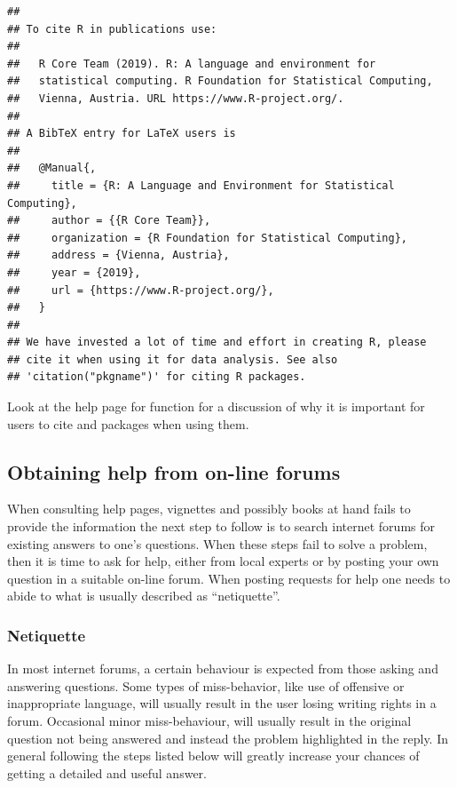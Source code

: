 \documentclass[krantz2]{krantz}\usepackage{knitr}%
\begin{document}
\begin{knitrout}\footnotesize
{}\color{fgcolor}\begin{kframe}
\begin{alltt}
\hlstd{()}
\end{alltt}
\begin{verbatim}
## 
## To cite R in publications use:
## 
##   R Core Team (2019). R: A language and environment for
##   statistical computing. R Foundation for Statistical Computing,
##   Vienna, Austria. URL https://www.R-project.org/.
## 
## A BibTeX entry for LaTeX users is
## 
##   @Manual{,
##     title = {R: A Language and Environment for Statistical Computing},
##     author = {{R Core Team}},
##     organization = {R Foundation for Statistical Computing},
##     address = {Vienna, Austria},
##     year = {2019},
##     url = {https://www.R-project.org/},
##   }
## 
## We have invested a lot of time and effort in creating R, please
## cite it when using it for data analysis. See also
## 'citation("pkgname")' for citing R packages.
\end{verbatim}
\end{kframe}
\end{knitrout}

\begin{playground}
  Look at the help page for function  for a discussion of why it is important for users to cite \Rpgrm and packages when using them.
\end{playground}

\subsection{Obtaining help from on-line forums}

When consulting help pages, vignettes and possibly books at hand fails to provide the information the next step to follow is to search internet forums for existing answers to one's questions. When these steps fail to solve a problem, then it is time to ask for help, either from local experts or by posting your own question in a suitable on-line forum. When posting requests for help one needs to abide to what is usually described as ``netiquette''.

\subsubsection{Netiquette}
In most internet forums, a certain behaviour is expected from those asking and answering questions. Some types of miss-behavior, like use of offensive or inappropriate language, will usually result in the user losing writing rights in a forum. Occasional minor miss-behaviour, will usually result in the original question not being answered and instead the problem highlighted in the reply. In general following the steps listed below will greatly increase your chances of getting a detailed and useful answer.
\end{document}
